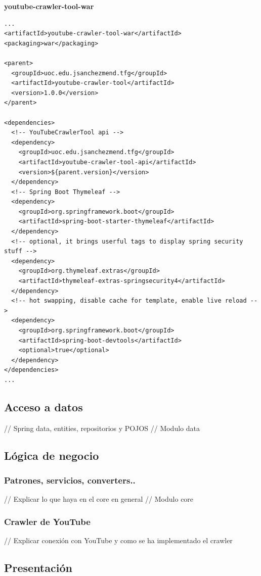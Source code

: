 \documentclass[11pt,a4paper]{article}
\begin{document}
\noindent\textbf{youtube-crawler-tool-war}
\begin{lstlisting}[style=C]
...
<artifactId>youtube-crawler-tool-war</artifactId>
<packaging>war</packaging>

<parent>
  <groupId>uoc.edu.jsanchezmend.tfg</groupId>
  <artifactId>youtube-crawler-tool</artifactId>
  <version>1.0.0</version>
</parent>

<dependencies>
  <!-- YouTubeCrawlerTool api -->
  <dependency>
    <groupId>uoc.edu.jsanchezmend.tfg</groupId>
    <artifactId>youtube-crawler-tool-api</artifactId>
    <version>${parent.version}</version>
  </dependency>
  <!-- Spring Boot Thymeleaf -->
  <dependency>
    <groupId>org.springframework.boot</groupId>
    <artifactId>spring-boot-starter-thymeleaf</artifactId>
  </dependency>
  <!-- optional, it brings userful tags to display spring security stuff -->
  <dependency>
    <groupId>org.thymeleaf.extras</groupId>
    <artifactId>thymeleaf-extras-springsecurity4</artifactId>
  </dependency>
  <!-- hot swapping, disable cache for template, enable live reload -->
  <dependency>
    <groupId>org.springframework.boot</groupId>
    <artifactId>spring-boot-devtools</artifactId>
    <optional>true</optional>
  </dependency>
</dependencies>
...
\end{lstlisting}

\medskip 

\subsection{Acceso a datos}
// Spring data, entities, repositorios y POJOS
// Modulo data
\medskip 

\subsection{Lógica de negocio}
\medskip 
\subsubsection{Patrones, servicios, converters..}
// Explicar lo que haya en el core en general
// Modulo core
\medskip 
\subsubsection{Crawler de YouTube}
// Explicar conexión con YouTube y como se ha implementado el crawler
\medskip

\subsection{Presentación}
\medskip 
\end{document}
